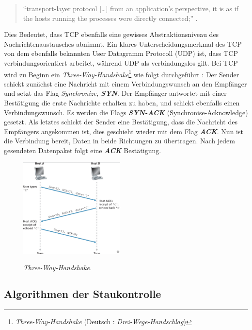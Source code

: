 \documentclass[paper=a4,fontsize=12pt,ngerman]{scrartcl}
\begin{document}
\begin{quote}
``transport-layer protocol [\dots] from an application’s perspective, it is as if 
the hosts running the processes were directly connected;'' \cite[241]{kr22}.      
\end{quote}
 

Dies Bedeutet, dass TCP ebenfalls eine gewisses Abstraktionsniveau
des Nachrichtenaustausches abnimmt. 
\newline
Ein klares Unterscheidungsmerkmal des TCP von dem ebenfalls bekannten User Datagramm Protocoll (UDP)
ist, dass TCP verbindungsorientiert arbeitet, während UDP als verbindungslos gilt.
Bei TCP wird zu Beginn ein \textit{Three-Way-Handshake}\footnote{\textit{Three-Way-Handshake} (Deutsch : \textit{Drei-Wege-Handschlag})} 
wie folgt durchgeführt : 
\newline
Der Sender schickt zunächst eine Nachricht mit einem Verbindungswunsch an den Empfänger und setzt das Flag 
\textit{Synchronize, \textbf{SYN}}.
\newline
Der Empfänger antwortet mit einer Bestätigung die erste Nachrichte erhalten zu haben, und schickt ebenfalls einen 
Verbindungswunsch. Es werden die Flags \textit{\textbf{SYN-ACK}} (Synchronise-Acknowledge) gesetzt.
\newline
Als letztes schickt der Sender eine Bestätigung, dass die Nachricht des Empfängers angekommen ist, dies geschieht wieder
mit dem Flag \textit{\textbf{ACK}}. Nun ist die Verbindung bereit, Daten in beide Richtungen zu übertragen.
Nach jedem gesendeten Datenpaket folgt eine \textit{\textbf{ACK}} Bestätigung.

\begin{figure}[ht]
    \centering
    \includegraphics[height = 5cm]{./graphics/3way.png}
    \caption{\textit{Three-Way-Handshake.}}  \cite[296]{kr22}
\end{figure}



\subsection{Algorithmen der Staukontrolle }
\end{document}
